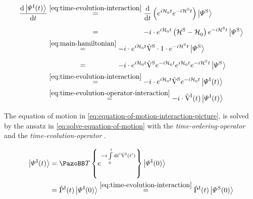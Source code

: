 \begin{equation}
    \label{eq:equation-of-motion-interaction-picture}
    \begin{split}
        \difft{\ketpsiof[\interactionPicture]{t}} &\stackrel{\ref{eq:time-evolution-interaction}}{=}
        \difft{} \left(e^{i \HzeroHamiltonian{} t} e^{-i \pictureHamiltonian[\schroedingerPicture]{} t} \right)\ketpsi[\schroedingerPicture]{} \\
        &\stackrel{\phantom{\ref{eq:time-evolution-interaction}}}{=} -i \cdot e^{i \HzeroHamiltonian{} t}\left( \pictureHamiltonian[\schroedingerPicture]{} - \HzeroHamiltonian{} \right) e^{-i \pictureHamiltonian[\schroedingerPicture]{} t} \ketpsi[\schroedingerPicture]{}\\
        &\stackrel{\ref{eq:main-hamiltonian}}{=} -i \cdot e^{i \HzeroHamiltonian{} t} \Vhamiltonian[\schroedingerPicture] \cdot 1 \cdot e^{-i \pictureHamiltonian[\schroedingerPicture]{} t} \ketpsi[\schroedingerPicture]{}\\
        &\stackrel{\phantom{\ref{eq:main-hamiltonian}}}{=} -i \cdot e^{i \HzeroHamiltonian{} t} \Vhamiltonian[\schroedingerPicture] e^{-i \HzeroHamiltonian{} t}e^{i \HzeroHamiltonian{} t} e^{-i \pictureHamiltonian[\schroedingerPicture]{} t} \ketpsi[\schroedingerPicture]{}\\
        &\stackrel{\ref{eq:time-evolution-interaction}}{=} -i \cdot e^{i \HzeroHamiltonian{} t} \Vhamiltonian[\schroedingerPicture] e^{-i \HzeroHamiltonian{} t}\ketpsiof[\interactionPicture]{t}\\
        &\stackrel{\ref{eq:time-evolution-operator-interaction}}{=} -i \cdot \VhamiltonianOfT[\interactionPicture] \ketpsiof[\interactionPicture]{t}
    \end{split}
\end{equation}

The equation of motion in \autoref{eq:equation-of-motion-interaction-picture}, is solved by the ansatz in \autoref{eq:solve-equation-of-motion} with the  \emph{time-ordering-operator} \timeOrderingOperator and the \emph{time-evolution-operator} \timeEvolutionOperator[\interactionPicture].

\begin{equation}
    \label{eq:solve-equation-of-motion}
    \begin{split}
        \ketpsiof[\interactionPicture]{t} &= \timeOrderingOperator \left\lbrace e^{-i\int\limits_0^t \text{d} t' \VhamiltonianOf[\interactionPicture]{t'}}\right\rbrace \ketpsiof[\interactionPicture]{0}\\
        &= \timeEvolutionOperator[\interactionPicture] \ketpsiof[\interactionPicture]{0} \stackrel{\ref{eq:time-evolution-interaction}}{=} \timeEvolutionOperator[\interactionPicture] \ketpsiof[\schroedingerPicture]{0}
    \end{split}
\end{equation}

